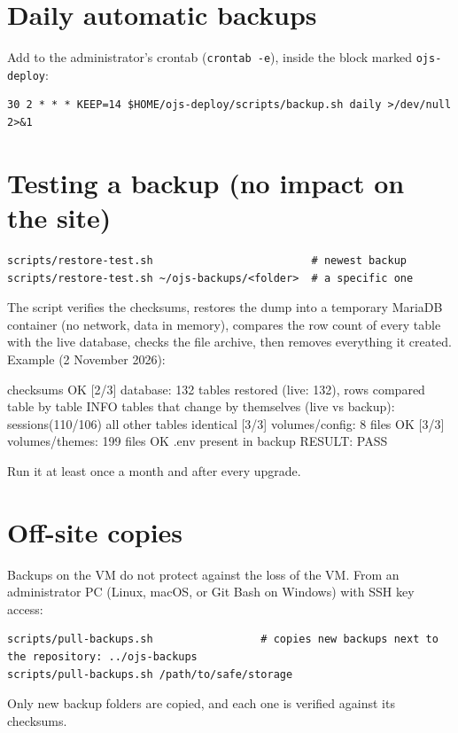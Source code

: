 \documentclass[11pt,a4paper]{report}
\newcommand{\code}[1]{\texttt{\small #1}}
\begin{document}
\section{Daily automatic backups}\label{sec:dailybackup}
Add to the administrator's crontab (\code{crontab -e}), inside the block marked \code{ojs-deploy}:
\begin{lstlisting}
30 2 * * * KEEP=14 $HOME/ojs-deploy/scripts/backup.sh daily >/dev/null 2>&1
\end{lstlisting}

\section{Testing a backup (no impact on the site)}
\begin{lstlisting}
scripts/restore-test.sh                         # newest backup
scripts/restore-test.sh ~/ojs-backups/<folder>  # a specific one
\end{lstlisting}
The script verifies the checksums, restores the dump into a temporary MariaDB container (no
network, data in memory), compares the row count of every table with the live database, checks
the file archive, then removes everything it created. Example (2 November 2026):
\begin{termout}
[1/3] checksums OK
[2/3] database: 132 tables restored (live: 132), rows compared table by table
      INFO tables that change by themselves (live vs backup): sessions(110/106)
      all other tables identical
[3/3] volumes/config: 8 files OK
[3/3] volumes/themes: 199 files OK
      .env present in backup
RESULT: PASS
\end{termout}
Run it at least once a month and after every upgrade.

\section{Off-site copies}
Backups on the VM do not protect against the loss of the VM. From an administrator PC (Linux,
macOS, or Git Bash on Windows) with SSH key access:
\begin{lstlisting}
scripts/pull-backups.sh                 # copies new backups next to the repository: ../ojs-backups
scripts/pull-backups.sh /path/to/safe/storage
\end{lstlisting}
Only new backup folders are copied, and each one is verified against its checksums.
\end{document}
